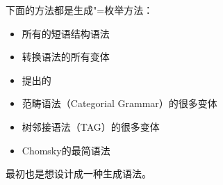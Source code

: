 下面的方法都是生成"=枚举方法：
\begin{itemize}
\item 所有的短语结构语法
\item 转换语法的所有变体
\item \citet*{GKPS85a}提出的\gpsgc 
\item 范畴语法\indexcgc（Categorial Grammar）的很多变体
\item 树邻接语法\indextagc（TAG）的很多变体
\item Chomsky的最简语法
\end{itemize}
\lfg 最初也是想设计成一种生成语法。

